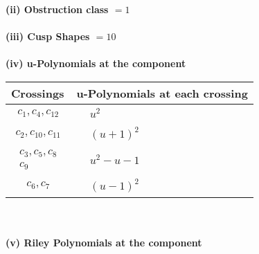 \documentclass[1p]{elsarticle_modified}
\theoremstyle{definition}
\begin{document}
\flushleft \textbf{(ii) Obstruction class $= 1$}\\~\\
\flushleft \textbf{(iii) Cusp Shapes $= 10$}\\~\\
\newpage\renewcommand{\arraystretch}{1}
\flushleft \textbf{(iv) u-Polynomials at the component}\newline \\
\begin{tabular}{m{50pt}|m{274pt}}
Crossings & \hspace{64pt}u-Polynomials at each crossing \\
\hline $$\begin{aligned}c_{1},c_{4},c_{12}\end{aligned}$$&$\begin{aligned}
&u^2
\end{aligned}$\\
\hline $$\begin{aligned}c_{2},c_{10},c_{11}\end{aligned}$$&$\begin{aligned}
&(u+1)^2
\end{aligned}$\\
\hline $$\begin{aligned}c_{3},c_{5},c_{8}\\c_{9}\end{aligned}$$&$\begin{aligned}
&u^2- u-1
\end{aligned}$\\
\hline $$\begin{aligned}c_{6},c_{7}\end{aligned}$$&$\begin{aligned}
&(u-1)^2
\end{aligned}$\\
\hline
\end{tabular}\\~\\
\newpage\renewcommand{\arraystretch}{1}
\flushleft \textbf{(v) Riley Polynomials at the component}\newline \\
\end{document}
